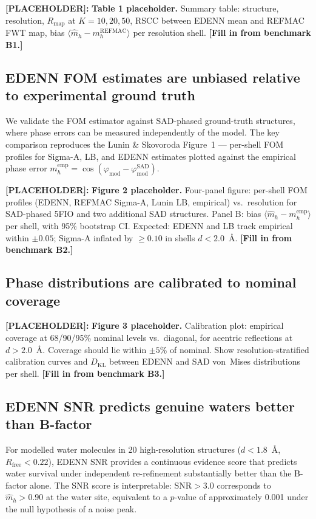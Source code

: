 \documentclass[10pt,twocolumn]{article}
\newcommand{\placeholder}[1]{%
  \begin{mdframed}[
    linecolor=placeholder,linewidth=1pt,
    backgroundcolor=red!5,
    innertopmargin=6pt,innerbottommargin=6pt,
    innerleftmargin=8pt,innerrightmargin=8pt]
  \small\color{placeholder}\textbf{[PLACEHOLDER]:} #1
  \end{mdframed}
}
\newcommand{\phimod}{\varphi_{\mathrm{mod}}}
\newcommand{\SNR}{\mathrm{SNR}}
\begin{document}
\placeholder{
\textbf{Table 1 placeholder.}
Summary table: structure, resolution, $R_{\mathrm{map}}$ at
$K=10,20,50$, RSCC between EDENN mean and REFMAC FWT map,
bias $\langle\hat m_h - m_h^{\mathrm{REFMAC}}\rangle$ per
resolution shell.
\textbf{[Fill in from benchmark B1.]}
}

\subsection{EDENN FOM estimates are unbiased relative to
experimental ground truth}

We validate the FOM estimator against SAD-phased ground-truth
structures, where phase errors can be measured independently
of the model.
The key comparison reproduces the Lunin \& Skovoroda Figure~1
— per-shell FOM profiles for Sigma-A, LB, and EDENN estimates
plotted against the empirical phase error $m_h^{\mathrm{emp}} =
\cos(\phimod - \phimod^{\mathrm{SAD}})$.

\placeholder{
\textbf{Figure 2 placeholder.}
Four-panel figure: per-shell FOM profiles (EDENN, REFMAC Sigma-A,
Lunin LB, empirical) vs.\ resolution for SAD-phased 5FIO and two
additional SAD structures.
Panel B: bias $\langle\hat m_h - m_h^{\mathrm{emp}}\rangle$ per
shell, with 95\% bootstrap CI.
Expected: EDENN and LB track empirical within $\pm 0.05$;
Sigma-A inflated by $\geq 0.10$ in shells $d < 2.0$~\AA.
\textbf{[Fill in from benchmark B2.]}
}

\subsection{Phase distributions are calibrated to nominal coverage}

\placeholder{
\textbf{Figure 3 placeholder.}
Calibration plot: empirical coverage at 68/90/95\% nominal levels
vs.\ diagonal, for acentric reflections at $d > 2.0$~\AA.
Coverage should lie within $\pm 5$\% of nominal.
Show resolution-stratified calibration curves and
$D_{\mathrm{KL}}$ between EDENN and SAD von~Mises distributions
per shell.
\textbf{[Fill in from benchmark B3.]}
}

\subsection{EDENN SNR predicts genuine waters better than B-factor}

For modelled water molecules in 20 high-resolution structures
($d < 1.8$~\AA, $R_{\mathrm{free}} < 0.22$), EDENN SNR provides
a continuous evidence score that predicts water survival under
independent re-refinement substantially better than the B-factor
alone.
The SNR score is interpretable: $\SNR > 3.0$ corresponds to
$\hat m_h > 0.90$ at the water site, equivalent to a $p$-value of
approximately 0.001 under the null hypothesis of a noise peak.
\end{document}

